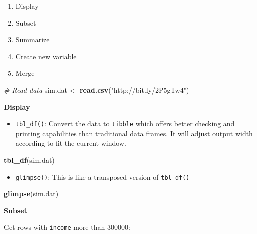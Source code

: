 \documentclass[12pt,]{krantz}
\makeatletter
\newenvironment{Shaded}{\begin{snugshade}}{\end{snugshade}}
\newcommand{\CommentTok}[1]{\textcolor[rgb]{0.37,0.37,0.37}{\textit{#1}}}
\newcommand{\DecValTok}[1]{\textcolor[rgb]{0.06,0.06,0.06}{#1}}
\newcommand{\KeywordTok}[1]{\textcolor[rgb]{0.27,0.27,0.27}{\textbf{#1}}}
\newcommand{\NormalTok}[1]{#1}
\newcommand{\OperatorTok}[1]{\textcolor[rgb]{0.43,0.43,0.43}{\textbf{#1}}}
\newcommand{\StringTok}[1]{\textcolor[rgb]{0.5,0.5,0.5}{#1}}
\providecommand{\tightlist}{%
  \setlength{\itemsep}{0pt}\setlength{\parskip}{0pt}}
\newenvironment{kframe}{%
\medskip{}
\setlength{\fboxsep}{.8em}
 \def\at@end@of@kframe{}%
 \ifinner\ifhmode%
  \def\at@end@of@kframe{\end{minipage}}%
  \begin{minipage}{\columnwidth}%
 \fi\fi%
 \def\FrameCommand##1{\hskip\@totalleftmargin \hskip-\fboxsep
 \colorbox{shadecolor}{##1}\hskip-\fboxsep
     \hskip-\linewidth \hskip-\@totalleftmargin \hskip\columnwidth}%
 \MakeFramed {\advance\hsize-\width
   \@totalleftmargin\z@ \linewidth\hsize
   \@setminipage}}%
 {\par\unskip\endMakeFramed%
 \at@end@of@kframe}
\renewenvironment{Shaded}{\begin{kframe}}{\end{kframe}}
\makeatother
\begin{document}
\begin{enumerate}
\def\labelenumi{\arabic{enumi}.}
\tightlist
\item
  Display
\item
  Subset
\item
  Summarize
\item
  Create new variable
\item
  Merge
\end{enumerate}

\begin{Shaded}
\begin{Highlighting}[]
\CommentTok{# Read data}
\NormalTok{sim.dat <-}\StringTok{ }\KeywordTok{read.csv}\NormalTok{(}\StringTok{"http://bit.ly/2P5gTw4"}\NormalTok{)}
\end{Highlighting}
\end{Shaded}

\textbf{Display}

\begin{itemize}
\tightlist
\item
  \texttt{tbl\_df()}: Convert the data to \texttt{tibble} which offers better checking and printing capabilities than traditional data frames. It will adjust output width according to fit the current window.
\end{itemize}

\begin{Shaded}
\begin{Highlighting}[]
\KeywordTok{tbl_df}\NormalTok{(sim.dat)}
\end{Highlighting}
\end{Shaded}

\begin{itemize}
\tightlist
\item
  \texttt{glimpse()}: This is like a transposed version of \texttt{tbl\_df()}
\end{itemize}

\begin{Shaded}
\begin{Highlighting}[]
\KeywordTok{glimpse}\NormalTok{(sim.dat)}
\end{Highlighting}
\end{Shaded}

\textbf{Subset}

Get rows with \texttt{income} more than 300000:

\begin{Shaded}
\end{Shaded}
\end{document}
